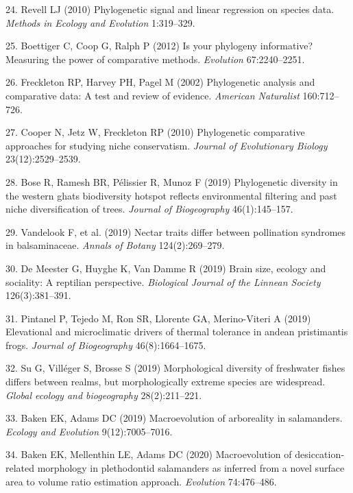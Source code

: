 \documentclass[9pt,twocolumn,twoside,lineno]{pnas-new}
\begin{document}
\leavevmode\hypertarget{ref-Revell2010}{}%
24. Revell LJ (2010) Phylogenetic signal and linear regression on
species data. \emph{Methods in Ecology and Evolution} 1:319--329.

\leavevmode\hypertarget{ref-Boettiger_et_al2012}{}%
25. Boettiger C, Coop G, Ralph P (2012) Is your phylogeny informative?
Measuring the power of comparative methods. \emph{Evolution}
67:2240--2251.

\leavevmode\hypertarget{ref-Freckleton_et_al2002}{}%
26. Freckleton RP, Harvey PH, Pagel M (2002) Phylogenetic analysis and
comparative data: A test and review of evidence. \emph{American
Naturalist} 160:712--726.

\leavevmode\hypertarget{ref-Cooper2010}{}%
27. Cooper N, Jetz W, Freckleton RP (2010) Phylogenetic comparative
approaches for studying niche conservatism. \emph{Journal of
Evolutionary Biology} 23(12):2529--2539.

\leavevmode\hypertarget{ref-Bose2019}{}%
28. Bose R, Ramesh BR, Pélissier R, Munoz F (2019) Phylogenetic
diversity in the western ghats biodiversity hotspot reflects
environmental filtering and past niche diversification of trees.
\emph{Journal of Biogeography} 46(1):145--157.

\leavevmode\hypertarget{ref-Vandelook2019}{}%
29. Vandelook F, et al. (2019) Nectar traits differ between pollination
syndromes in balsaminaceae. \emph{Annals of Botany} 124(2):269--279.

\leavevmode\hypertarget{ref-DeMeester2019}{}%
30. De Meester G, Huyghe K, Van Damme R (2019) Brain size, ecology and
sociality: A reptilian perspective. \emph{Biological Journal of the
Linnean Society} 126(3):381--391.

\leavevmode\hypertarget{ref-Pintanel2019}{}%
31. Pintanel P, Tejedo M, Ron SR, Llorente GA, Merino-Viteri A (2019)
Elevational and microclimatic drivers of thermal tolerance in andean
pristimantis frogs. \emph{Journal of Biogeography} 46(8):1664--1675.

\leavevmode\hypertarget{ref-Su2019}{}%
32. Su G, Villéger S, Brosse S (2019) Morphological diversity of
freshwater fishes differs between realms, but morphologically extreme
species are widespread. \emph{Global ecology and biogeography}
28(2):211--221.

\leavevmode\hypertarget{ref-Baken2019}{}%
33. Baken EK, Adams DC (2019) Macroevolution of arboreality in
salamanders. \emph{Ecology and Evolution} 9(12):7005--7016.

\leavevmode\hypertarget{ref-Baken2020}{}%
34. Baken EK, Mellenthin LE, Adams DC (2020) Macroevolution of
desiccation‐related morphology in plethodontid salamanders as inferred
from a novel surface area to volume ratio estimation approach.
\emph{Evolution} 74:476--486.
\end{document}
